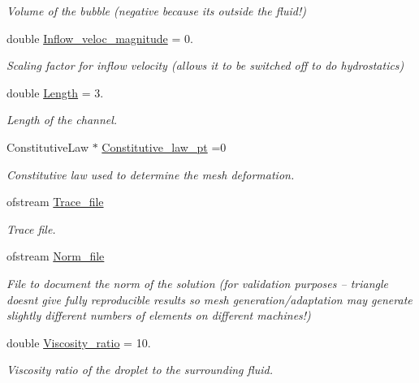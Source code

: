 \begin{DoxyCompactItemize}
\begin{DoxyCompactList}\small\item\em Volume of the bubble (negative because it\textquotesingle{}s outside the fluid!) \end{DoxyCompactList}\item 
double \hyperlink{namespaceProblem__Parameter_a7792613e563a733ad88b8e15d126fc3a}{Inflow\+\_\+veloc\+\_\+magnitude} = 0.
\begin{DoxyCompactList}\small\item\em Scaling factor for inflow velocity (allows it to be switched off to do hydrostatics) \end{DoxyCompactList}\item 
double \hyperlink{namespaceProblem__Parameter_a7b67840fea463f29b53d12f7bd7cb34b}{Length} = 3.
\begin{DoxyCompactList}\small\item\em Length of the channel. \end{DoxyCompactList}\item 
Constitutive\+Law $\ast$ \hyperlink{namespaceProblem__Parameter_a810f05c8d3e3331aed75643557d1057c}{Constitutive\+\_\+law\+\_\+pt} =0
\begin{DoxyCompactList}\small\item\em Constitutive law used to determine the mesh deformation. \end{DoxyCompactList}\item 
ofstream \hyperlink{namespaceProblem__Parameter_a55310be5f2dfcb5fcfe35d71f9c16e06}{Trace\+\_\+file}
\begin{DoxyCompactList}\small\item\em Trace file. \end{DoxyCompactList}\item 
ofstream \hyperlink{namespaceProblem__Parameter_a388e06a5e637b21378ab1832e5564bec}{Norm\+\_\+file}
\begin{DoxyCompactList}\small\item\em File to document the norm of the solution (for validation purposes -- triangle doesn\textquotesingle{}t give fully reproducible results so mesh generation/adaptation may generate slightly different numbers of elements on different machines!) \end{DoxyCompactList}\item 
double \hyperlink{namespaceProblem__Parameter_afdb95f68bd3c77e4c12001a29bd26e31}{Viscosity\+\_\+ratio} = 10.
\begin{DoxyCompactList}\small\item\em Viscosity ratio of the droplet to the surrounding fluid. \end{DoxyCompactList}\end{DoxyCompactItemize}


